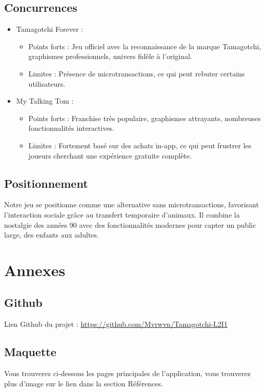 \documentclass{cahier_des_charges}
\begin{document}
\subsection{Concurrences}
\begin{itemize}[label=\textbullet]
\item Tamagotchi Forever :
\begin{itemize}[label=\textendash]
\item Points forts : Jeu officiel avec la reconnaissance de la marque Tamagotchi,
graphismes professionnels, univers fidèle à l’original.
\item Limites : Présence de microtransactions, ce qui peut rebuter certains utilisateurs.
\end{itemize}
\item My Talking Tom :
\begin{itemize}[label=\textendash]
\item Points forts : Franchise très populaire, graphismes attrayants, nombreuses
fonctionnalités interactives.
\item Limites : Fortement basé sur des achats in-app, ce qui peut frustrer les joueurs
cherchant une expérience gratuite complète.
\end{itemize}
\end{itemize}
\subsection{Positionnement}
Notre jeu se positionne comme une alternative sans microtransactions, favorisant l’interaction
sociale grâce au transfert temporaire d’animaux. Il combine la nostalgie des années 90 avec des
fonctionnalités modernes pour capter un public large, des enfants aux adultes.
\section{Annexes}
\subsection{Github}
Lien Github du projet : \href{https://github.com/Mvrwvn/Tamagotchi-L2I1}{https://github.com/Mvrwvn/Tamagotchi-L2I1}
\subsection{Maquette}
Vous trouverez ci-dessous les pages principales de l'application, vous trouverez plus d'image sur le lien dans la section Références.
\end{document}

